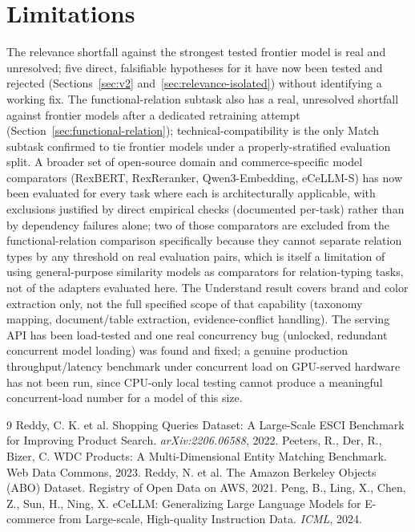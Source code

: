 \documentclass{article}
\begin{document}
\section{Limitations}
\label{sec:limitations}
The relevance shortfall against the strongest tested frontier model is real and unresolved; five direct, falsifiable hypotheses for it have now been tested and rejected (Sections~\ref{sec:v2} and~\ref{sec:relevance-isolated}) without identifying a working fix. The functional-relation subtask also has a real, unresolved shortfall against frontier models after a dedicated retraining attempt (Section~\ref{sec:functional-relation}); technical-compatibility is the only Match subtask confirmed to tie frontier models under a properly-stratified evaluation split. A broader set of open-source domain and commerce-specific model comparators (RexBERT, RexReranker, Qwen3-Embedding, eCeLLM-S) has now been evaluated for every task where each is architecturally applicable, with exclusions justified by direct empirical checks (documented per-task) rather than by dependency failures alone; two of those comparators are excluded from the functional-relation comparison specifically because they cannot separate relation types by any threshold on real evaluation pairs, which is itself a limitation of using general-purpose similarity models as comparators for relation-typing tasks, not of the adapters evaluated here. The Understand result covers brand and color extraction only, not the full specified scope of that capability (taxonomy mapping, document/table extraction, evidence-conflict handling). The serving API has been load-tested and one real concurrency bug (unlocked, redundant concurrent model loading) was found and fixed; a genuine production throughput/latency benchmark under concurrent load on GPU-served hardware has not been run, since CPU-only local testing cannot produce a meaningful concurrent-load number for a model of this size.


\begin{thebibliography}{9}
 Reddy, C. K. et al. Shopping Queries Dataset: A Large-Scale ESCI Benchmark for Improving Product Search. \emph{arXiv:2206.06588}, 2022.
 Peeters, R., Der, R., Bizer, C. WDC Products: A Multi-Dimensional Entity Matching Benchmark. Web Data Commons, 2023.
 Reddy, N. et al. The Amazon Berkeley Objects (ABO) Dataset. Registry of Open Data on AWS, 2021.
 Peng, B., Ling, X., Chen, Z., Sun, H., Ning, X. eCeLLM: Generalizing Large Language Models for E-commerce from Large-scale, High-quality Instruction Data. \emph{ICML}, 2024.
\end{thebibliography}
\end{document}
